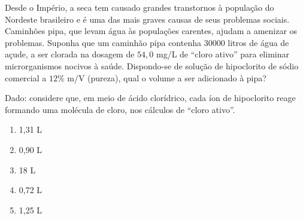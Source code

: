 Desde o Império, a seca tem causado grandes transtornos à população do Nordeste brasileiro e é uma das mais graves causas de seus problemas sociais.
Caminhões pipa, que levam água às populações carentes, ajudam a amenizar os problemas.
Suponha que um caminhão pipa contenha $30000$ litros de água de açude, a ser clorada na dosagem de $54,0$ mg/L de “cloro ativo” para eliminar microrganismos nocivos à saúde.
Dispondo-se de solução de hipoclorito de sódio comercial a $12 \%$ m/V (pureza), qual o volume a ser adicionado à pipa?

Dado: considere que, em meio de ácido clorídrico, cada íon de hipoclorito reage formando uma molécula de cloro, nos cálculos de “cloro ativo”.

\begin{enumerate}[label = (\alph*)]
	\item 1,31 L
	\item 0,90 L
	\item 18 L
	\item 0,72 L
	\item 1,25 L
\end{enumerate}
